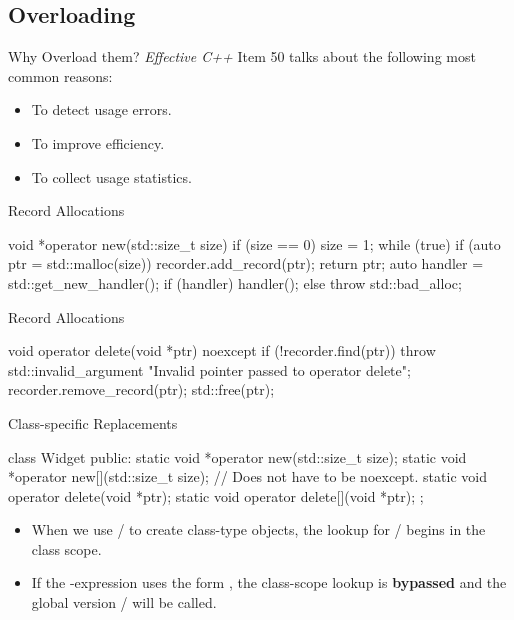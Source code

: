 \documentclass{beamer}
\begin{document}
\subsection{Overloading}

\begin{frame}{Why Overload them?}
  \textit{Effective C++} Item 50 talks about the following most common reasons:
  \begin{itemize}
    \item To detect usage errors.
    \item To improve efficiency.
    \item To collect usage statistics.
  \end{itemize}
\end{frame}

\begin{frame}[fragile]{Record Allocations}
  \begin{cpp}
void *operator new(std::size_t size) {
  if (size == 0)
    size = 1;
  while (true) {
    if (auto ptr = std::malloc(size)) {
      recorder.add_record(ptr);
      return ptr;
    }
    auto handler = std::get_new_handler();
    if (handler)
      handler();
    else
      throw std::bad_alloc{};
  }
}
  \end{cpp}
\end{frame}

\begin{frame}[fragile]{Record Allocations}
  \begin{cpp}
void operator delete(void *ptr) noexcept {
  if (!recorder.find(ptr))
    throw std::invalid_argument
        {"Invalid pointer passed to operator delete"};
  recorder.remove_record(ptr);
  std::free(ptr);
}
  \end{cpp}
\end{frame}

\begin{frame}[fragile]{Class-specific Replacements}
  \begin{cpp}
class Widget {
 public:
  static void *operator new(std::size_t size);
  static void *operator new[](std::size_t size);
  // Does not have to be noexcept.
  static void operator delete(void *ptr);
  static void operator delete[](void *ptr);
};
  \end{cpp}
  \begin{itemize}
    \item When we use / to create class-type objects, the lookup for /\ttt{[]} begins in the class scope.
    \item If the -expression uses the form , the class-scope lookup is \textbf{bypassed} and the global version / will be called.
  \end{itemize}
\end{frame}
\end{document}
